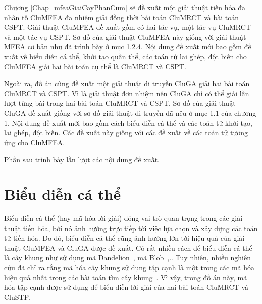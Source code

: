 Chương \ref{Chap_mfeaGiaiCayPhanCum} sẽ đề xuất một giải thuật tiến hóa đa nhân tố CluMFEA đa nhiệm giải đồng thời bài toán CluMRCT và bài toán CSPT. Giải thuật CluMFEA đề xuất gồm có hai tác vụ, một tác vụ CluMRCT và một tác vụ CSPT. Sơ đồ của giải thuật CluMFEA này giống với giải thuật MFEA cơ bản như đã trình bày ở mục 1.2.4. Nội dung đề xuất mới bao gồm đề xuất về biểu diễn cá thể, khởi tạo quần thể, các toán tử lai ghép, đột biến cho CluMFEA giải hai bài toán cụ thể là CluMRCT và CSPT.

Ngoài ra, đồ án cũng đề xuất một giải thuật di truyền CluGA giải hai bài toán CluMRCT và CSPT. Vì là giải thuật đơn nhiệm nên CluGA chỉ có thể giải lần lượt từng bài trong hai bài toán CluMRCT và CSPT. Sơ đồ của giải thuật CluGA đề xuất giống với sơ đồ giải thuật di truyền đã nêu ở mục 1.1 của chương 1. Nội dung đề xuất mới bao gồm cách biểu diễn cá thể và các toán tử khởi tạo, lai ghép, đột biến. Các đề xuất này giống với các đề xuất về các toán tử tương ứng cho CluMFEA.

Phần sau trình bày lần lượt các nội dung đề xuất.



\section{Biểu diễn cá thể} \label{chap_mfeaProposed:sec:bieudiencathe}
Biểu diễn cá thể (hay mã hóa lời giải) đóng vai trò quan trọng trong các giải thuật tiến hóa, bởi nó ảnh hưởng trực tiếp tới việc lựa chọn và xây dựng các toán tử tiến hóa. Do đó, biểu diễn cá thể cũng ảnh hưởng lớn tới hiệu quả của giải thuật CluMFEA và CluGA được đề xuất. Có rất nhiều cách để biểu diễn cá thể là cây khung như sử dụng mã Dandelion~\cite{perfecto_dandelion_encoded_2016}, mã Blob~\cite{julstrom2005blob},.. Tuy nhiên, nhiều nghiên cứu đã chỉ ra rằng mã hóa cây khung sử dụng tập cạnh là một trong các mã hóa hiệu quả nhất trong các bài toán tìm cây khung~\cite{julstrom_initialization_2002, raidl_edge_2003, rothlauf_representations_2008}. Vì vậy, trong đồ án này, mã hóa tập cạnh được sử dụng để biểu diễn lời giải của hai bài toán CluMRCT và CluSTP.


